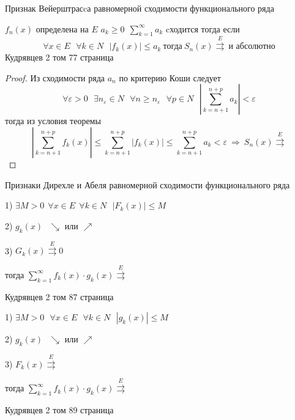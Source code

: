 \begin{title}[\Large]
  Признак Вейерштрасcа равномерной сходимости функционального ряда
\end{title}

\begin{block}
  $f_n(x)$ определена на $E$ $a_k \ge 0 ~~ \sum_{k=1}^{\infty}a_k$ cходится
  тогда если
  $$
  \forall x \in E ~~~ \forall k \in N~~~ |f_k(x)| \le a_k ~ \text{тогда} ~
  S_n (x) \stackrel{E}{\rightrightarrows} ~ \text{и абсолютно}
  $$
  Кудрявцев 2 том 77 страница
\end{block}

\begin{proof}
  Из сходимости ряда $a_n$ по критерию Коши следует
  $$
  \forall \varepsilon > 0 ~~~ \exists n_{\varepsilon} \in N ~~~ \forall n \ge
  n_{\varepsilon} ~~~ \forall p \in N ~~~ \left| \sum_{k=n+1}^{n+p} a_k \right|
  < \varepsilon
  $$
  тогда из условия теоремы
  $$
  \left| \sum_{k = n + 1}^{n+p} f_k(x) \right| \le
  \sum_{k = n + 1}^{n+p} |f_k(x)| \le \sum_{k = n+1}^{n+p} a_k < \varepsilon ~
  \Rightarrow ~ S_n(x)\stackrel{E}{\rightrightarrows}
  $$
\end{proof}

\begin{title}[\Large]
  Признаки Дирехле и Абеля равномерной сходимости функционального ряда
\end{title}

\begin{block}
  1) $\exists M > 0 ~~ \forall x \in E ~~ \forall k \in N ~~~ |F_k(x)| \le M$

  2) $g_k(x) ~~~ \searrow$ или $\nearrow$

  3) $G_k(x) \stackrel{E}{\rightrightarrows} 0$

  тогда $\sum_{k=1}^{\infty} f_k(x) \cdot g_k(x)\stackrel{E}{\rightrightarrows}$

  Кудрявцев 2 том 87 страница
\end{block}

\begin{block}
  1) $\exists M > 0 ~~~ \forall x \in E ~~~ \forall k \in N ~~~ |g_k(x)| \le M$

  2) $g_k(x) ~~~ \searrow$ или $\nearrow$

  3) $F_k(x) \stackrel{E}{\rightrightarrows}$

  тогда $\sum_{k=1}^{\infty} f_k(x) \cdot g_k(x)\stackrel{E}{\rightrightarrows}$

  Кудрявцев 2 том 89 страница
\end{block}

